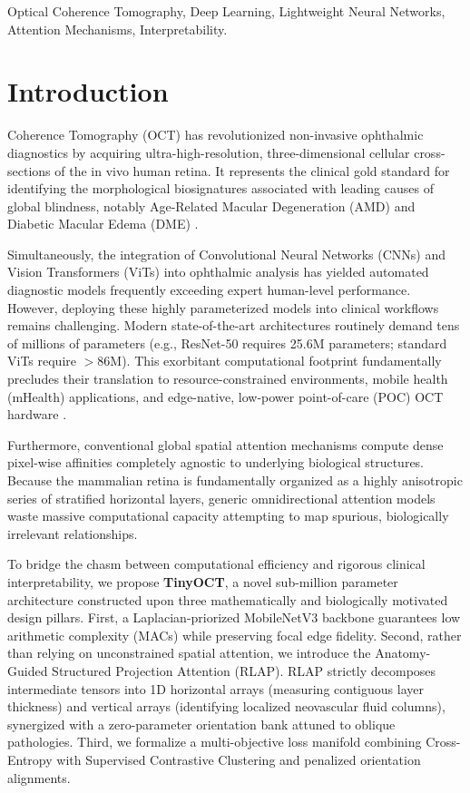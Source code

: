 \documentclass[journal]{IEEEtran}
\begin{document}
\begin{IEEEkeywords}
Optical Coherence Tomography, Deep Learning, Lightweight Neural Networks, Attention Mechanisms, Interpretability.
\end{IEEEkeywords}

\section{Introduction}
 Coherence Tomography (OCT) has revolutionized non-invasive ophthalmic diagnostics by acquiring ultra-high-resolution, three-dimensional cellular cross-sections of the in vivo human retina. It represents the clinical gold standard for identifying the morphological biosignatures associated with leading causes of global blindness, notably Age-Related Macular Degeneration (AMD) and Diabetic Macular Edema (DME) \cite{kermany2018identifying}. 

Simultaneously, the integration of Convolutional Neural Networks (CNNs) and Vision Transformers (ViTs) \cite{dosovitskiy2020image} into ophthalmic analysis has yielded automated diagnostic models frequently exceeding expert human-level performance. However, deploying these highly parameterized models into clinical workflows remains challenging. Modern state-of-the-art architectures routinely demand tens of millions of parameters (e.g., ResNet-50 requires 25.6M parameters; standard ViTs require $>$86M). This exorbitant computational footprint fundamentally precludes their translation to resource-constrained environments, mobile health (mHealth) applications, and edge-native, low-power point-of-care (POC) OCT hardware \cite{wang2023lightweight}. 

Furthermore, conventional global spatial attention mechanisms compute dense pixel-wise affinities completely agnostic to underlying biological structures. Because the mammalian retina is fundamentally organized as a highly anisotropic series of stratified horizontal layers, generic omnidirectional attention models waste massive computational capacity attempting to map spurious, biologically irrelevant relationships.

To bridge the chasm between computational efficiency and rigorous clinical interpretability, we propose \textbf{TinyOCT}, a novel sub-million parameter architecture constructed upon three mathematically and biologically motivated design pillars. First, a Laplacian-priorized MobileNetV3 backbone \cite{howard2019searching} guarantees low arithmetic complexity (MACs) while preserving focal edge fidelity. Second, rather than relying on unconstrained spatial attention, we introduce the Anatomy-Guided Structured Projection Attention (RLAP). RLAP strictly decomposes intermediate tensors into 1D horizontal arrays (measuring contiguous layer thickness) and vertical arrays (identifying localized neovascular fluid columns), synergized with a zero-parameter orientation bank attuned to oblique pathologies. Third, we formalize a multi-objective loss manifold combining Cross-Entropy with Supervised Contrastive Clustering \cite{khosla2020supervised} and penalized orientation alignments.
\end{document}
